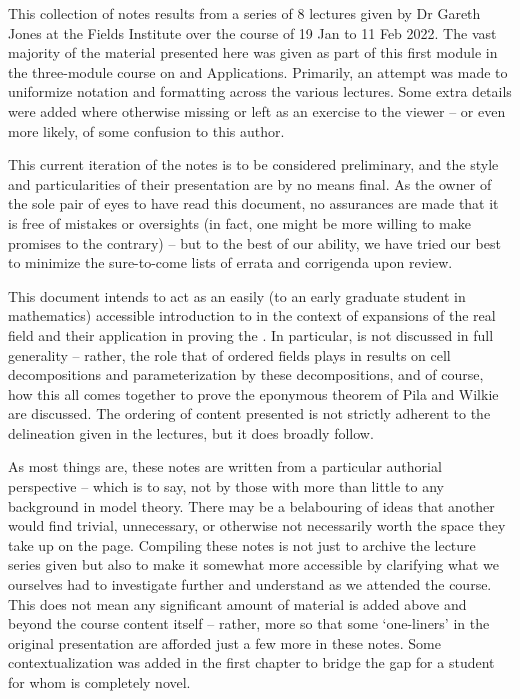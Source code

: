 %
%

\preface

This collection of notes results from a series of 8 lectures given by Dr Gareth Jones at the Fields Institute over the course of 19 Jan to 11 Feb 2022. The vast majority of the material presented here was given as part of this first module in the three-module course on \omy and Applications. Primarily, an attempt was made to uniformize notation and formatting across the various lectures. Some extra details were added where otherwise missing or left as an exercise to the viewer -- or even more likely, of some confusion to this author.

This current iteration of the notes is to be considered preliminary, and the style and particularities of their presentation are by no means final. As the owner of the sole pair of eyes to have read this document, no assurances are made that it is free of mistakes or oversights (in fact, one might be more willing to make promises to the contrary) -- but to the best of our ability, we have tried our best to minimize the sure-to-come lists of errata and corrigenda upon review.
 
This document intends to act as an easily (to an early graduate student in mathematics) accessible introduction to \omy in the context of expansions of the real field and their application in proving the \pwt. In particular, \omy is not discussed in full generality -- rather, the role that \omy of ordered fields plays in results on cell decompositions and parameterization by these decompositions, and of course, how this all comes together to prove the eponymous theorem of Pila and Wilkie are discussed. The ordering of content presented is not strictly adherent to the delineation given in the lectures, but it does broadly follow.

As most things are, these notes are written from a particular authorial perspective -- which is to say, not by those with more than little to any background in model theory. There may be a belabouring of ideas that another would find trivial, unnecessary, or otherwise not necessarily worth the space they take up on the page. Compiling these notes is not just to archive the lecture series given but also to make it somewhat more accessible by clarifying what we ourselves had to investigate further and understand as we attended the course. This does not mean any significant amount of material is added above and beyond the course content itself -- rather, more so that some `one-liners' in the original presentation are afforded just a few more in these notes. Some contextualization was added in the first chapter to bridge the gap for a student for whom \omy is completely novel.

